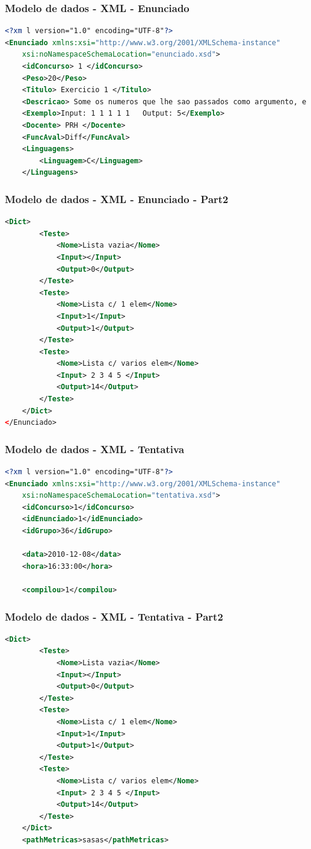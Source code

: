 \documentclass{beamer}
\begin{document}
\begin{frame}[fragile] \frametitle{Modelo de dados - XML - Enunciado}
\begin{lstlisting}[language=XML,basicstyle=\tiny,breaklines=true]
<?xm l version="1.0" encoding="UTF-8"?>
<Enunciado xmlns:xsi="http://www.w3.org/2001/XMLSchema-instance"
    xsi:noNamespaceSchemaLocation="enunciado.xsd">
    <idConcurso> 1 </idConcurso>
    <Peso>20</Peso>
    <Titulo> Exercicio 1 </Titulo>
    <Descricao> Some os numeros que lhe sao passados como argumento, e apresente o resultado. </Descricao>
    <Exemplo>Input: 1 1 1 1 1   Output: 5</Exemplo>
    <Docente> PRH </Docente>
    <FuncAval>Diff</FuncAval>  
    <Linguagens> 
        <Linguagem>C</Linguagem>        
    </Linguagens> 
\end{lstlisting}
\end{frame}

\begin{frame}[fragile] \frametitle{Modelo de dados - XML - Enunciado - Part2}
\begin{lstlisting}[language=XML,basicstyle=\tiny,breaklines=true]
    <Dict>
        <Teste>
            <Nome>Lista vazia</Nome>
            <Input></Input>
            <Output>0</Output>
        </Teste>
        <Teste>
            <Nome>Lista c/ 1 elem</Nome>
            <Input>1</Input>
            <Output>1</Output>
        </Teste>
        <Teste>
            <Nome>Lista c/ varios elem</Nome>
            <Input> 2 3 4 5 </Input>
            <Output>14</Output>
        </Teste>
    </Dict>
</Enunciado>
\end{lstlisting}
\end{frame}

\begin{frame}[fragile] \frametitle{Modelo de dados - XML - Tentativa}
\begin{lstlisting}[language=XML,basicstyle=\tiny,breaklines=true]
<?xm l version="1.0" encoding="UTF-8"?>
<Enunciado xmlns:xsi="http://www.w3.org/2001/XMLSchema-instance"
    xsi:noNamespaceSchemaLocation="tentativa.xsd">
    <idConcurso>1</idConcurso>
    <idEnunciado>1</idEnunciado>
    <idGrupo>36</idGrupo>
    
    <data>2010-12-08</data>
    <hora>16:33:00</hora>
    
    <compilou>1</compilou>
\end{lstlisting}
\end{frame}

\begin{frame}[fragile] \frametitle{Modelo de dados - XML - Tentativa - Part2}
\begin{lstlisting}[language=XML,basicstyle=\tiny,breaklines=true]
    <Dict>
        <Teste>
            <Nome>Lista vazia</Nome>
            <Input></Input>
            <Output>0</Output>
        </Teste>
        <Teste>
            <Nome>Lista c/ 1 elem</Nome>
            <Input>1</Input>
            <Output>1</Output>
        </Teste>
        <Teste>
            <Nome>Lista c/ varios elem</Nome>
            <Input> 2 3 4 5 </Input>
            <Output>14</Output>
        </Teste>
    </Dict>
    <pathMetricas>sasas</pathMetricas>
\end{lstlisting}
\end{frame}
\end{document}
